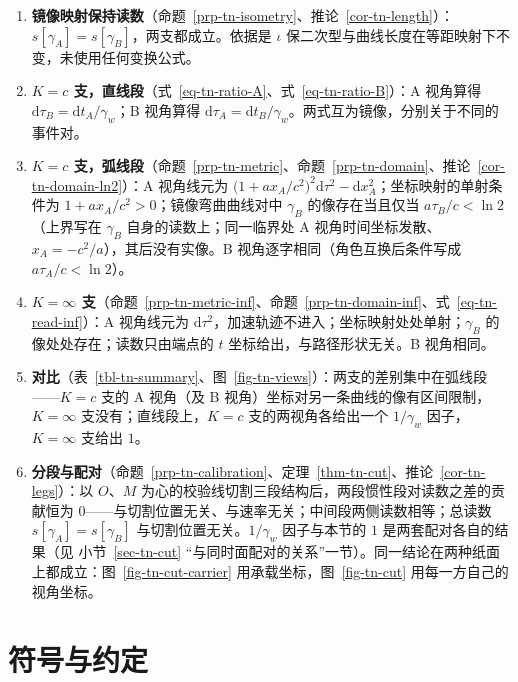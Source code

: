 \documentclass[
  chinese,
  a4paper,
  UTF8,
  12pt,
  oneside,
  openany]{ctexbook}
\providecommand{\tightlist}{%
  \setlength{\itemsep}{0pt}\setlength{\parskip}{0pt}}
\theoremstyle{plain}
\theoremstyle{plain}
\theoremstyle{plain}
\theoremstyle{definition}
\theoremstyle{plain}
\theoremstyle{plain}
\theoremstyle{remark}
\begin{document}
\begin{enumerate}
\def\labelenumi{\arabic{enumi}.}
\tightlist
\item
  \textbf{镜像映射保持读数}（命题~\ref{prp-tn-isometry}、推论~\ref{cor-tn-length}）：\(s[\gamma_A]=s[\gamma_B]\)，两支都成立。依据是
  \(\iota\) 保二次型与曲线长度在等距映射下不变，未使用任何变换公式。
\item
  \textbf{\(K=c\)
  支，直线段}（式~\ref{eq-tn-ratio-A}、式~\ref{eq-tn-ratio-B}）：A
  视角算得 \(\mathrm{d}\tau_B=\mathrm{d}t_A/\gamma_w\)；B 视角算得
  \(\mathrm{d}\tau_A=\mathrm{d}t_B/\gamma_w\)。两式互为镜像，分别关于不同的事件对。
\item
  \textbf{\(K=c\)
  支，弧线段}（命题~\ref{prp-tn-metric}、命题~\ref{prp-tn-domain}、推论~\ref{cor-tn-domain-ln2}）：A
  视角线元为
  \(\bigl(1+a x_A/c^{2}\bigr)^{2}\mathrm{d}\tau^{2}-\mathrm{d}x_A^{2}\)；坐标映射的单射条件为
  \(1+a x_A/c^{2}>0\)；镜像弯曲曲线对中 \(\gamma_B\) 的像存在当且仅当
  \(a\tau_B/c<\ln2\)（上界写在 \(\gamma_B\) 自身的读数上；同一临界处 A
  视角时间坐标发散、\(x_A=-c^{2}/a\)），其后没有实像。B
  视角逐字相同（角色互换后条件写成 \(a\tau_A/c<\ln2\)）。
\item
  \textbf{\(K=\infty\)
  支}（命题~\ref{prp-tn-metric-inf}、命题~\ref{prp-tn-domain-inf}、式~\ref{eq-tn-read-inf}）：A
  视角线元为
  \(\mathrm{d}\tau^{2}\)，加速轨迹不进入；坐标映射处处单射；\(\gamma_B\)
  的像处处存在；读数只由端点的 \(t\) 坐标给出，与路径形状无关。B
  视角相同。
\item
  \textbf{对比}（表~\ref{tbl-tn-summary}、图~\ref{fig-tn-views}）：两支的差别集中在弧线段------\(K=c\)
  支的 A 视角（及 B 视角）坐标对另一条曲线的像有区间限制，\(K=\infty\)
  支没有；直线段上，\(K=c\) 支的两视角各给出一个 \(1/\gamma_w\)
  因子，\(K=\infty\) 支给出 \(1\)。
\item
  \textbf{分段与配对}（命题~\ref{prp-tn-calibration}、定理~\ref{thm-tn-cut}、推论~\ref{cor-tn-legs}）：以
  \(O\)、\(M\)
  为心的校验线切割三段结构后，两段惯性段对读数之差的贡献恒为
  \(0\)------与切割位置无关、与速率无关；中间段两侧读数相等；总读数
  \(s[\gamma_A]=s[\gamma_B]\) 与切割位置无关。\(1/\gamma_w\)
  因子与本节的 \(1\) 是两套配对各自的结果（见 小节~\ref{sec-tn-cut}
  ``与同时面配对的关系''一节）。同一结论在两种纸面上都成立：图~\ref{fig-tn-cut-carrier}
  用承载坐标，图~\ref{fig-tn-cut} 用每一方自己的视角坐标。
\end{enumerate}


\chapter*{符号与约定}\label{sec-notation}
\end{document}
